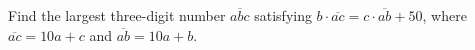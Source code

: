 Find the largest three-digit number $\overline{abc}$ satisfying $b\cdot\overline{ac}=c\cdot\overline{ab}+50$, where $\overline{ac}=10a+c$ and $\overline{ab}=10a+b$.
